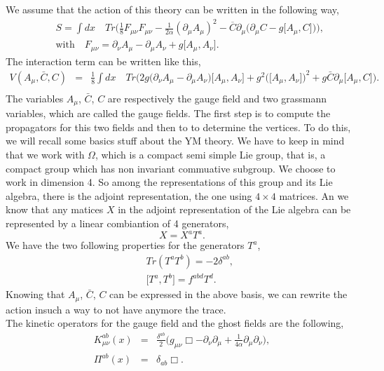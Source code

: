 \documentclass[a4paper,11pt]{article} %
\numberwithin{equation}{section} %
\numberwithin{figure}{section} %
\theoremstyle{plain} %
\theoremstyle{definition} %
\theoremstyle{remark} %
\begin{document}
\noindent
We assume that the action of this theory can be written in the following way,
\begin{eqnarray*}
 && S = \int dx \quad Tr \Bigg( \frac{1}{8} F_{\mu \nu} F_{\mu \nu} - \frac{1}{2\alpha} (\partial_{\mu} A_{\mu})^{2} - \overline{C} \partial_{\mu} \Big( \partial_{\mu} C - g \big[A_{\mu} , C \big] \Big) \Bigg), \\
 && \text{with} \quad F_{\mu \nu} = \partial_{\nu} A_{\mu} - \partial_{\mu} A_{\nu} + g \big[ A_{\mu} , A_{\nu} \big] .
\end{eqnarray*}
The interaction term can be written like this,
\begin{eqnarray}
 V(A_\mu , \bar{C} , C ) &=& \frac{1}{8} \int dx \quad Tr \Bigg( 2g \Big( \partial_{\nu} A_{\mu} - \partial_{\mu} A_{\nu} \Big) \big[ A_{\mu} , A_{\nu} \big] + g^2 \Big( \big[ A_{\mu} , A_{\nu} \big] \Big)^2 + g \bar{C} \partial_{\mu} \big[A_{\mu} , C \big] \Bigg). \nonumber \\ 
 \label{interaction_YM}
\end{eqnarray}
The variables $A_{\mu}$, $\bar C$, $C$ are respectively the gauge field and two grassmann variables, which are called the gauge fields. The first step is to compute the propagators for this two fields and then to to determine the vertices. To do this, we will recall some basics stuff about the YM theory. We have to keep in mind that we work with $\Omega$, which is a compact semi simple Lie group, that is, a compact group which has non invariant commuative subgroup. We choose to work in dimension 4. So among the representations of this group and its Lie algebra, there is the adjoint representation, the one using $4 \times 4$ matrices. An we know that any matices $X$ in the adjoint representation of the Lie algebra can be represented by a linear combiantion of 4 generators,
\begin{equation*}
 X = X^{a} T^{a}.
\end{equation*}
We have the two following properties for the generators $T^a$,
\begin{eqnarray*}
 && Tr( T^a T^b ) = - 2 \delta^{ab} , \\
 && \big[ T^a , T^b \big] = f^{abd} T^d .
\end{eqnarray*}
Knowing that $A_{\mu}$, $\bar C$, $C$ can be expressed in the above basis, we can rewrite the action insuch a way to not have anymore the trace.\\
The kinetic operators for the gauge field and the ghost fields are the following,
\begin{eqnarray*}
 K^{ab}_{\mu \nu} (x) &=& \frac{\delta^{ab}}{2} \Big( g_{\mu \nu} \Box - \partial_{\nu} \partial_{\mu} + \frac{1}{4 \alpha} \partial_{\mu} \partial_{\nu}  \Big) ,\\
 \Pi^{ab} (x) &=& \delta_{ab} \Box.
\end{eqnarray*}
\end{document}
